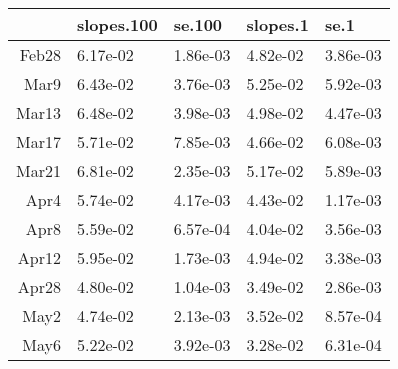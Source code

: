 \documentclass{article}
\begin{document}
\begin{table}[ht]
\centering
\begin{tabular}{rllll}
  \hline
 & slopes.100 & se.100 & slopes.1 & se.1 \\ 
  \hline
Feb28 & 6.17e-02 & 1.86e-03 & 4.82e-02 & 3.86e-03 \\ 
  Mar9 & 6.43e-02 & 3.76e-03 & 5.25e-02 & 5.92e-03 \\ 
  Mar13 & 6.48e-02 & 3.98e-03 & 4.98e-02 & 4.47e-03 \\ 
  Mar17 & 5.71e-02 & 7.85e-03 & 4.66e-02 & 6.08e-03 \\ 
  Mar21 & 6.81e-02 & 2.35e-03 & 5.17e-02 & 5.89e-03 \\ 
  Apr4 & 5.74e-02 & 4.17e-03 & 4.43e-02 & 1.17e-03 \\ 
  Apr8 & 5.59e-02 & 6.57e-04 & 4.04e-02 & 3.56e-03 \\ 
  Apr12 & 5.95e-02 & 1.73e-03 & 4.94e-02 & 3.38e-03 \\ 
  Apr28 & 4.80e-02 & 1.04e-03 & 3.49e-02 & 2.86e-03 \\ 
  May2 & 4.74e-02 & 2.13e-03 & 3.52e-02 & 8.57e-04 \\ 
  May6 & 5.22e-02 & 3.92e-03 & 3.28e-02 & 6.31e-04 \\ 
   \hline
\end{tabular}
\end{table}
\end{document}
